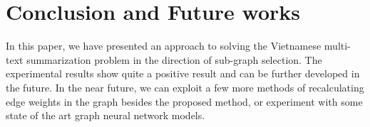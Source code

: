 \documentclass[11pt]{article}
\begin{document}
\section{Conclusion and Future works}

In this paper, we have presented an approach to solving the Vietnamese multi-text summarization problem in the direction of sub-graph selection. The experimental results show quite a positive result and can be further developed in the future. In the near future, we can exploit a few more methods of recalculating edge weights in the graph besides the proposed method, or experiment with some state of the art graph neural network models.



\end{document}
